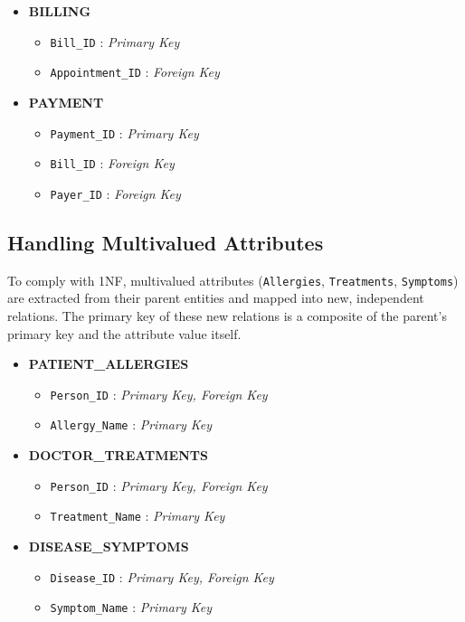 \documentclass[12pt,a4paper]{article}
\begin{document}
\begin{itemize}[label=\textbf{--}]
	\item \textbf{BILLING}
	      \begin{itemize}[label=$\bullet$]
		      \item \texttt{Bill\_ID} : \textit{Primary Key}
		      \item \texttt{Appointment\_ID} : \textit{Foreign Key}
	      \end{itemize}

	\item \textbf{PAYMENT}
	      \begin{itemize}[label=$\bullet$]
		      \item \texttt{Payment\_ID} : \textit{Primary Key}
		      \item \texttt{Bill\_ID} : \textit{Foreign Key}
		      \item \texttt{Payer\_ID} : \textit{Foreign Key}
	      \end{itemize}

\end{itemize}
\subsection{Handling Multivalued Attributes}
To comply with 1NF, multivalued attributes (\texttt{Allergies}, \texttt{Treatments}, \texttt{Symptoms}) are extracted from their parent entities and mapped into new, independent relations. The primary key of these new relations is a composite of the parent's primary key and the attribute value itself.

\begin{itemize}[label=\textbf{--}]

	\item \textbf{PATIENT\_ALLERGIES}
	      \begin{itemize}[label=$\bullet$]
		      \item \texttt{Person\_ID} : \textit{Primary Key, Foreign Key}
		      \item \texttt{Allergy\_Name} : \textit{Primary Key}
	      \end{itemize}

	\item \textbf{DOCTOR\_TREATMENTS}
	      \begin{itemize}[label=$\bullet$]
		      \item \texttt{Person\_ID} : \textit{Primary Key, Foreign Key}
		      \item \texttt{Treatment\_Name} : \textit{Primary Key}
	      \end{itemize}

	\item \textbf{DISEASE\_SYMPTOMS}
	      \begin{itemize}[label=$\bullet$]
		      \item \texttt{Disease\_ID} : \textit{Primary Key, Foreign Key}
		      \item \texttt{Symptom\_Name} : \textit{Primary Key}
	      \end{itemize}

\end{itemize}
\end{document}
